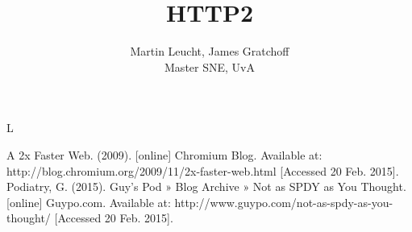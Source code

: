 \documentclass{article}
\begin{document}
 
\begin{figure}[!bh]
 	\begin{center}
		\huge \title{HTTP2}
		\author{ Martin Leucht, James Gratchoff \\
		Master SNE, UvA} 
	\maketitle 
		\label{sec:uva}
	\end{center}
\end{figure}L
\setlength{\columnsep}{2cm}
\def\columnseprulecolor{\color{blue}}
 
\begin{multicols}{2}








\begin{thebibliography}
A 2x Faster Web. (2009). [online] Chromium Blog. Available at: http://blog.chromium.org/2009/11/2x-faster-web.html [Accessed 20 Feb. 2015].
Podiatry, G. (2015). Guy's Pod » Blog Archive » Not as SPDY as You Thought. [online] Guypo.com. Available at: http://www.guypo.com/not-as-spdy-as-you-thought/ [Accessed 20 Feb. 2015].
\end{thebibliography}
\newpage
\appendix

\end{multicols}
\end{document}
